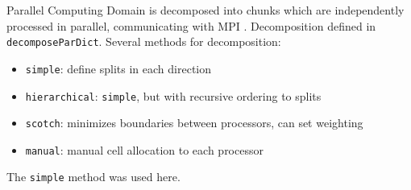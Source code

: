 \begin{frame}[allowframebreaks]{Parallel Computing}
Domain is decomposed into chunks which are independently processed in parallel, communicating with MPI \cite{walker}. Decomposition defined in \texttt{decomposeParDict}. Several methods for decomposition:
\begin{itemize}
\item \texttt{simple}: define splits in each direction 
\item \texttt{hierarchical}: \texttt{simple}, but with recursive ordering to splits
\item \texttt{scotch}: minimizes boundaries between processors, can set weighting
\item \texttt{manual}: manual cell allocation to each processor 
\end{itemize}
The \texttt{simple} method was used here. 


\end{frame}
